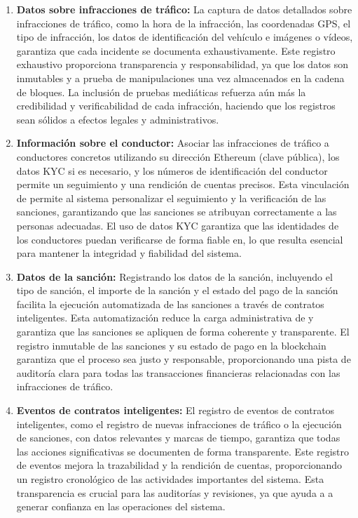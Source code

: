 \documentclass[
    letterpaper, 
    man,   
    spanish,
    12pt,
    donotrepeattitle,
    floatsintext,
    hidelinks %
]{apa7}
\begin{document}
\begin{enumerate}
    \item \textbf{Datos sobre infracciones de tráfico:} La captura de datos detallados sobre infracciones de tráfico, como la hora de la infracción, las coordenadas GPS, el tipo de infracción, los datos de identificación del vehículo e imágenes o vídeos, garantiza que cada incidente se documenta exhaustivamente. Este registro exhaustivo proporciona transparencia y responsabilidad, ya que los datos son inmutables y a prueba de manipulaciones una vez almacenados en la cadena de bloques. La inclusión de pruebas mediáticas refuerza aún más la credibilidad y verificabilidad de cada infracción, haciendo que los registros sean sólidos a efectos legales y administrativos. 
    \item \textbf{Información sobre el conductor:} Asociar las infracciones de tráfico a conductores concretos utilizando su dirección Ethereum (clave pública), los datos KYC si es necesario, y los números de identificación del conductor permite un seguimiento y una rendición de cuentas precisos. Esta vinculación de permite al sistema personalizar el seguimiento y la verificación de las sanciones, garantizando que las sanciones se atribuyan correctamente a las personas adecuadas. El uso de datos KYC garantiza que las identidades de los conductores puedan verificarse de forma fiable en, lo que resulta esencial para mantener la integridad y fiabilidad del sistema.
    \item \textbf{Datos de la sanción: }  Registrando los datos de la sanción, incluyendo el tipo de sanción, el importe de la sanción y el estado del pago de la sanción facilita la ejecución automatizada de las sanciones a través de contratos inteligentes. Esta automatización reduce la carga administrativa de y garantiza que las sanciones se apliquen de forma coherente y transparente. El registro inmutable de las sanciones y su estado de pago en la blockchain garantiza que el proceso sea justo y responsable, proporcionando una pista de auditoría clara para todas las transacciones financieras relacionadas con las infracciones de tráfico.
        \item \textbf{Eventos de contratos inteligentes:} El registro de eventos de contratos inteligentes, como el registro de nuevas infracciones de tráfico o la ejecución de sanciones, con datos relevantes y marcas de tiempo, garantiza que todas las acciones significativas se documenten de forma transparente. Este registro de eventos mejora la trazabilidad y la rendición de cuentas, proporcionando un registro cronológico de las actividades importantes del sistema. Esta transparencia es crucial para las auditorías y revisiones, ya que ayuda a a generar confianza en las operaciones del sistema. 

\end{enumerate}
\end{document}
